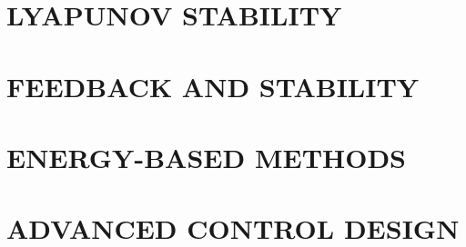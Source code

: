 \documentclass[
	11pt, %
	fleqn, %
	a4paper, %
]{LegrandOrangeBook}
\begin{document}
\part{LYAPUNOV STABILITY}



\part{FEEDBACK AND STABILITY}




\part{ENERGY-BASED METHODS}
 


\part{ADVANCED CONTROL DESIGN}



\stopcontents[part] %





\end{document}
